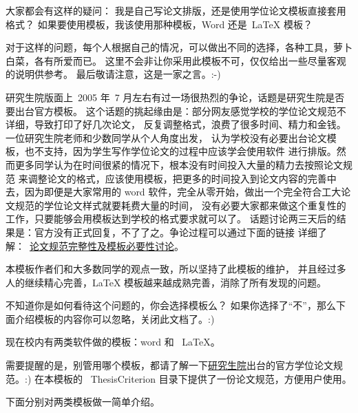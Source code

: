 
\label{Tricks}

\label{tricks:abouttemplates}

大家都会有这样的疑问：
我是自己写论文排版，还是使用学位论文模板直接套用格式？
如果要使用模板，我该使用那种模板，Word 还是~\LaTeX{} 模板？

对于这样的问题，每个人根据自己的情况，可以做出不同的选择，各种工具，萝卜白菜，各有所爱而已。
这里不会非让你采用此模板不可，仅仅给出一些尽量客观的说明供参考。
最后敬请注意，这是一家之言。:-)

\label{tricks:necessaryornot}

研究生院版面上~2005 年~7 月左右有过一场很热烈的争论，话题是研究生院是否要出台官方模板。
这个话题的挑起缘由是：部分网友感觉学校的学位论文规范不详细，导致打印了好几次论文，
反复调整格式，浪费了很多时间、精力和金钱。一位研究生院老师和少数同学从个人角度出发，
认为学校没有必要出台论文模板，也不支持，因为学生写作学位论文的过程中应该学会使用软件
进行排版。然而更多同学认为在时间很紧的情况下，根本没有时间投入大量的精力去按照论文规范
来调整论文的格式，应该使用模板，把更多的时间投入到论文内容的完善中去，因为即便是大家常用的 word 软件，完全从零开始，做出一个完全符合工大论文规范的学位论文样式就要耗费大量的时间，
没有必要大家都来做这个重复性的工作，只要能够会用模板达到学校的格式要求就可以了。
话题讨论两三天后的结果是：官方没有正式回复，不了了之。争论过程可以通过下面的链接
详细了解：~\href{http://bbs.hit.edu.cn/cgi-bin/bbs/bbs0an?path=\%2Fgroups\%2FGROUP\%5F6\%2FTeX\%2Ftex05\%2Fabout}{论文规范完整性及模板必要性讨论}。

本模板作者们和大多数同学的观点一致，所以坚持了此模板的维护，
并且经过多人的继续精心完善，LaTeX 模板越来越成熟完善，消除了所有发现的问题。

不知道你是如何看待这个问题的，你会选择模板么？ 如果你选择了``不''，那么下面介绍模板的内容你可以忽略，关闭此文档了。:)

现在校内有两类软件做的模板：word 和~ LaTeX。

需要提醒的是，别管用哪个模板，都请了解一下\href{http://hitgs.hit.edu.cn/}{研究生院}出台的官方学位论文规范。:)
在本模板的~ ThesisCriterion 目录下提供了一份论文规范，方便用户使用。

下面分别对两类模板做一简单介绍。

